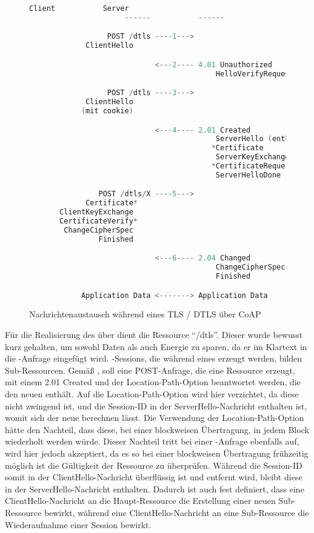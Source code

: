 \begin{figure}[ht]
  \centering
  \begin{lstlisting}[language=c]
                      Client           Server
                      ------           ------

                  POST /dtls ----1--->
             ClientHello

                             <---2---- 4.01 Unauthorized
                                           HelloVerifyRequest

                  POST /dtls ----3--->
             ClientHello
            (mit cookie)

                             <---4---- 2.01 Created
                                           ServerHello (enthält Session X)
                                          *Certificate
                                           ServerKeyExchange
                                          *CertificateRequest
                                           ServerHelloDone

                POST /dtls/X ----5--->
             Certificate*
       ClientKeyExchange
       CertificateVerify*
        ChangeCipherSpec
                Finished

                             <---6---- 2.04 Changed
                                           ChangeCipherSpec
                                           Finished

            Application Data <-------> Application Data
  \end{lstlisting}
  \caption{Nachrichtenaustausch während eines TLS / DTLS  über CoAP}
  \label{fig:coaphandshake}
\end{figure}

Für die Realisierung des  über  dient die Ressource "`/dtls"'. Dieser  wurde bewusst kurz gehalten, um sowohl Daten
als auch Energie zu sparen, da er im Klartext in die -Anfrage eingefügt wird. -Sessions, die während eines  erzeugt
werden, bilden Sub-Ressourcen. Gemäß  \cite[Abschnitt 5.8.2]{draftcoap13}, soll eine POST-Anfrage, die eine Ressource erzeugt, mit einem
2.01 Created und der Location-Path-Option beantwortet werden, die den neuen  enthält. Auf die Location-Path-Option wird hier verzichtet,
da diese nicht zwingend ist, und die Session-ID in der ServerHello-Nachricht enthalten ist, womit sich der neue  berechnen lässt. Die Verwendung
der Location-Path-Option hätte den Nachteil, dass diese, bei einer blockweisen Übertragung, in jedem Block wiederholt werden würde. Dieser Nachteil
tritt bei einer -Anfrage ebenfalls auf, wird hier jedoch akzeptiert, da es so bei einer blockweisen Übertragung frühzeitig möglich ist
die Gültigkeit der Ressource zu überprüfen. Während die Session-ID somit in der ClientHello-Nachricht überflüssig ist und entfernt wird, bleibt diese in der
ServerHello-Nachricht enthalten. Dadurch ist auch fest definiert, dass eine ClientHello-Nachricht an die Haupt-Ressource die Erstellung einer neuen
Sub-Ressource bewirkt, während eine ClientHello-Nachricht an eine Sub-Ressource die Wiederaufnahme einer Session bewirkt.

